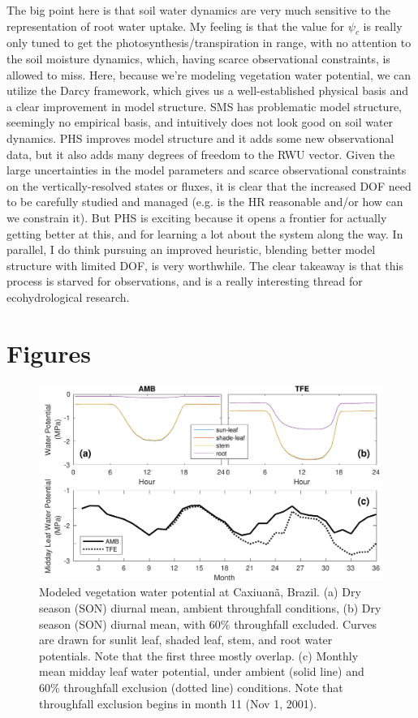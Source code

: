\documentclass[draft,linenumbers]{agujournal}
\begin{document}
The big point here is that soil water dynamics are very much sensitive to the representation of root water uptake.
My feeling is that the value for $\psi_c$ is really only tuned to get the photosynthesis/transpiration in range, 
with no attention to the soil moisture dynamics, which, having scarce observational constraints, is allowed to miss.
Here, because we're modeling vegetation water potential, we can utilize the Darcy framework, which gives us a well-established physical basis and a clear improvement in model structure.
SMS has problematic model structure, seemingly no empirical basis, and intuitively does not look good on soil water dynamics.
PHS improves model structure and it adds some new observational data, but it also adds many degrees of freedom to the RWU vector. 
Given the large uncertainties in the model parameters and scarce observational constraints on the vertically-resolved states or fluxes, 
it is clear that the increased DOF need to be carefully studied and managed (e.g. is the HR reasonable and/or how can we constrain it).
But PHS is exciting because it opens a frontier for actually getting better at this, and for learning a lot about the system along the way.
In parallel, I do think pursuing an improved heuristic, blending better model structure with limited DOF, is very worthwhile.
The clear takeaway is that this process is starved for observations, and is a really interesting thread for ecohydrological research.

\clearpage    

\section{Figures}
  \begin{figure}[h]
     \centering
     \includegraphics[width=30pc]{../figs2/fig2.pdf}
     \caption{Modeled vegetation water potential at  Caxiuan\~a, Brazil.
     (a) Dry season (SON) diurnal mean, ambient throughfall conditions,
     (b) Dry season (SON) diurnal mean, with 60\% throughfall excluded.
     Curves are drawn for sunlit leaf, shaded leaf, stem, and root water potentials. Note that the first three mostly overlap.
     (c) Monthly mean midday leaf water potential, under ambient (solid line) and 60\% throughfall exclusion (dotted line) conditions.
     Note that throughfall exclusion begins in month 11 (Nov 1, 2001).
     }
     \label{fig:vwp}
  \end{figure}
  
\end{document}
